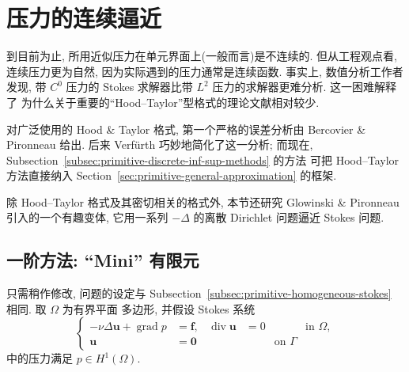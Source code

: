 
\section{压力的连续逼近}\label{sec:primitive-continuous-pressure}

到目前为止, 所用近似压力在单元界面上(一般而言)是不连续的. 但从工程观点看,
连续压力更为自然, 因为实际遇到的压力通常是连续函数. 事实上, 数值分析工作者发现,
带 $C^0$ 压力的 Stokes 求解器比带 $L^2$ 压力的求解器更难分析. 这一困难解释了
为什么关于重要的“Hood--Taylor”型格式的理论文献相对较少.

对广泛使用的 Hood \& Taylor 格式, 第一个严格的误差分析由
Bercovier \& Pironneau 给出. 后来 Verfürth 巧妙地简化了这一分析;
而现在, Subsection~\ref{subsec:primitive-discrete-inf-sup-methods} 的方法
可把 Hood--Taylor 方法直接纳入 Section~\ref{sec:primitive-general-approximation}
的框架.

除 Hood--Taylor 格式及其密切相关的格式外, 本节还研究
Glowinski \& Pironneau 引入的一个有趣变体, 它用一系列 $-\Delta$ 的离散
Dirichlet 问题逼近 Stokes 问题.

\subsection{一阶方法: ``Mini'' 有限元}\label{subsec:primitive-mini-element}

只需稍作修改, 问题的设定与
Subsection~\ref{subsec:primitive-homogeneous-stokes} 相同. 取 $\Omega$ 为有界平面
多边形, 并假设 Stokes 系统
\begin{equation}\label{eq:primitive-continuous-pressure-stokes-system}
\left\{
\begin{aligned}
-\nu\Delta\mathbf u+\operatorname{grad}p&=\mathbf f,
&\operatorname{div}\mathbf u&=0 &&\text{in }\Omega,\\
\mathbf u&=\mathbf0 &&&\text{on }\Gamma
\end{aligned}
\right.
\end{equation}
中的压力满足 $p\in H^1(\Omega)$.

